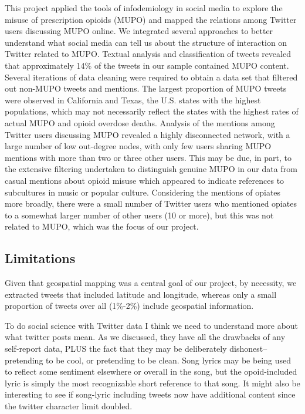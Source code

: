 \documentclass[sigconf]{acmart}
\begin{document}
This project applied the tools of infodemiology in social media to explore the 
misuse of prescription opioids (MUPO) and mapped the relations among Twitter 
users discussing MUPO online. We integrated several approaches to better 
understand what social media can tell us about the structure of interaction on 
Twitter related to MUPO. Textual analysis and classification of tweets revealed 
that approximately 14\% of the tweets in our sample contained MUPO content. 
Several iterations of data cleaning were required to obtain a data set that 
filtered out non-MUPO tweets and mentions. The largest proportion of MUPO 
tweets were observed in California and Texas, the U.S. states with the highest 
populations, which may not necessarily reflect the states with the highest 
rates of actual MUPO and opioid overdose deaths. Analysis of the mentions 
among Twitter users discussing MUPO revealed a highly disconnected network, 
with a large number of low out-degree nodes, with only few users sharing MUPO 
mentions with more than two or three other users. This may be due, in part, to 
the extensive filtering undertaken to distinguish genuine MUPO in our data from
casual mentions about opioid misuse which appeared to indicate references to 
subcultures in music or popular culture. Considering the mentions of opiates 
more broadly, there were a small number of Twitter users who mentioned opiates 
to a somewhat larger number of other users (10 or more), but this was not 
related to MUPO, which was the focus of our project.

\subsection{Limitations}

 
Given that geospatial mapping was a central goal of our project, by necessity, 
we extracted tweets that included latitude and longitude, whereas only a 
small proportion of tweets over all (1\%-2\%) include geospatial information.
 
 
 
 
To do social science with Twitter data I think we need to understand more about 
what twitter posts mean. As we discussed, they have all the drawbacks of any 
self-report data, PLUS the fact that they may be deliberately dishonest–
pretending to be cool, or pretending to be clean. Song lyrics may be being used 
to reflect some sentiment elsewhere or overall in the song, but the opoid-included 
lyric is simply the most recognizable short reference to that song. It might also 
be interesting to see if song-lyric including tweets now have additional 
content since the twitter character limit doubled.
 
\end{document}
